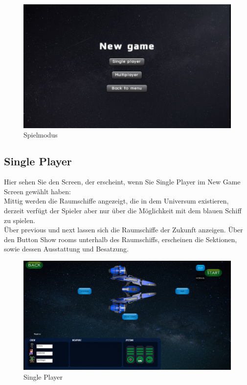 \documentclass[fontsize=12pt,paper=a4,twoside]{scrartcl}
\begin{document}
\begin{figure}[htp]
	\centering
	\includegraphics[width=1.00\linewidth]{pics/gamemodescreen.png}
	\caption{Spielmodus}
	\label{fig1}
\end{figure}

\subsection{Single Player}

Hier sehen Sie den Screen, der erscheint, wenn Sie Single Player im New Game Screen gewählt haben:\\
Mittig werden die Raumschiffe angezeigt, die in dem Universum existieren, derzeit verfügt der Spieler aber nur über die Möglichkeit mit dem blauen Schiff zu spielen.\\
Über previous und next lassen sich die Raumschiffe der Zukunft anzeigen. Über den Button Show rooms unterhalb des Raumschiffs, erscheinen die Sektionen, sowie dessen Ausstattung
und Besatzung.

\begin{figure}[htp]
	\centering
	\includegraphics[width=1.00\linewidth]{pics/SinglePlayer01.png}
	\caption{Single Player}
	\label{fig1}
\end{figure}
\end{document}
